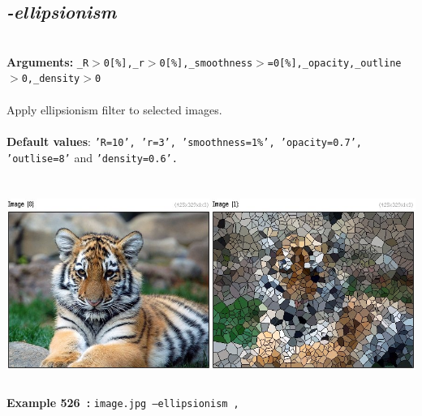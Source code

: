 \documentclass[a4paper,11pt,twoside]{book}
\begin{document}
\subsection{\emph{-ellipsionism} }\vspace*{-0.5em}
~\\\textbf{Arguments: } 
{\small \texttt{\_R$>$0[\%],\_r$>$0[\%],\_smoothness$>$=0[\%],\_opacity,\_outline$>$0,\_density$>$0}}\\~\\
Apply ellipsionism filter to selected images.
~\\~\\\textbf{Default values}: {\small \texttt{'R=10', 'r=3', 'smoothness=1\%', 'opacity=0.7', 'outlise=8'} and \texttt{'density=0.6'.}}
\begin{center}\includegraphics[keepaspectratio=true,height=7cm,width=\textwidth]{img/gmic_def526.jpg}\\
{\footnotesize \textbf{Example 526~:} \texttt{image.jpg --ellipsionism ,}}
\end{center}
\end{document}
